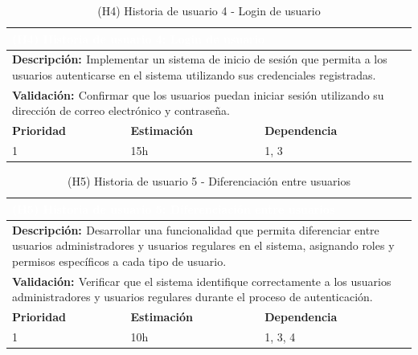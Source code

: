 \begin{table}[H]
  \centering
  \renewcommand{\arraystretch}{1.5}
  \begin{tabular}{|p{}|p{}|p{}|}
    \hline
    \multicolumn{3}{|l|}{\cellcolor{OrangeVIU}\textcolor{white}{\textbf{(H4) Historia de usuario 4: Login de usuario}}} \\
    \hline
    \multicolumn{3}{|p{\dimexpr0.9\linewidth+2\tabcolsep+2\arrayrulewidth}|}{{\textbf{\textcolor{naranja}{Descripción: }}}Implementar un sistema de inicio de sesión que permita a los usuarios autenticarse en el sistema utilizando sus credenciales registradas.} \\
    \hline
    \multicolumn{3}{|p{\dimexpr0.9\linewidth+2\tabcolsep+2\arrayrulewidth}|}{{\textbf{\textcolor{naranja}{Validación: }} Confirmar que los usuarios puedan iniciar sesión utilizando su dirección de correo electrónico y contraseña.}} \\
    \hline
    {\textbf{\textcolor{naranja}{Prioridad }}}  & {\textbf{\textcolor{naranja}{Estimación }}}  & {\textbf{\textcolor{naranja}{Dependencia }}}  \\
    \hline
    1 &  15h &  1, 3 \\
    \hline
  \end{tabular}
  \caption{(H4) Historia de usuario 4 - Login de usuario}
  \label{table:H4}
\end{table}

\begin{table}[H]
  \centering
  \renewcommand{\arraystretch}{1.5}
  \begin{tabular}{|p{}|p{}|p{}|}
    \hline
    \multicolumn{3}{|l|}{\cellcolor{OrangeVIU}\textcolor{white}{\textbf{(H5) Historia de usuario 5: Diferenciación entre usuarios}}} \\
    \hline
    \multicolumn{3}{|p{\dimexpr0.9\linewidth+2\tabcolsep+2\arrayrulewidth}|}{{\textbf{\textcolor{naranja}{Descripción: }}}Desarrollar una funcionalidad que permita diferenciar entre usuarios administradores y usuarios regulares en el sistema, asignando roles y permisos específicos a cada tipo de usuario.} \\
    \hline
    \multicolumn{3}{|p{\dimexpr0.9\linewidth+2\tabcolsep+2\arrayrulewidth}|}{{\textbf{\textcolor{naranja}{Validación: }} Verificar que el sistema identifique correctamente a los usuarios administradores y usuarios regulares durante el proceso de autenticación.}} \\
    \hline
    {\textbf{\textcolor{naranja}{Prioridad }}}  & {\textbf{\textcolor{naranja}{Estimación }}}  & {\textbf{\textcolor{naranja}{Dependencia }}}  \\
    \hline
    1 &  10h &  1, 3, 4  \\
    \hline
  \end{tabular}
  \caption{(H5) Historia de usuario 5 - Diferenciación entre usuarios}
  \label{table:H5}
\end{table}


